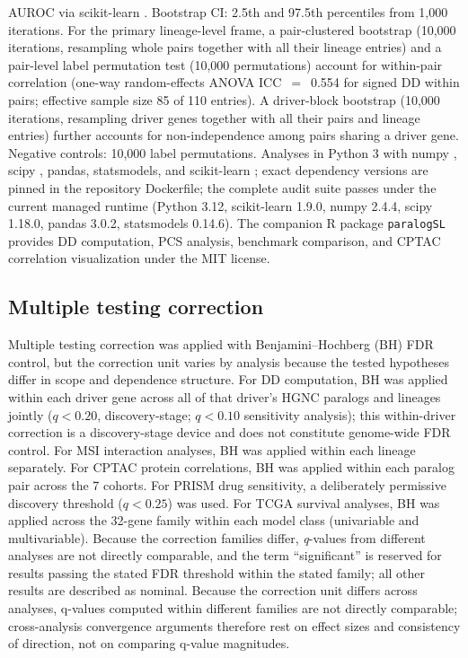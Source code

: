 \documentclass[11pt,a4paper]{article}
\begin{document}
AUROC via scikit-learn \cite{Pedregosa2011}. Bootstrap CI: 2.5th and 97.5th percentiles from 1,000 iterations. For the primary lineage-level frame, a pair-clustered bootstrap (10{,}000 iterations, resampling whole pairs together with all their lineage entries) and a pair-level label permutation test (10{,}000 permutations) account for within-pair correlation (one-way random-effects ANOVA ICC~$=$~0.554 for signed DD within pairs; effective sample size 85 of 110 entries). A driver-block bootstrap (10{,}000 iterations, resampling driver genes together with all their pairs and lineage entries) further accounts for non-independence among pairs sharing a driver gene. Negative controls: 10,000 label permutations. Analyses in Python 3 with numpy \cite{Harris2020}, scipy \cite{Virtanen2020}, pandas, statsmodels, and scikit-learn \cite{Pedregosa2011}; exact dependency versions are pinned in the repository Dockerfile; the complete audit suite passes under the current managed runtime (Python 3.12, scikit-learn 1.9.0, numpy 2.4.4, scipy 1.18.0, pandas 3.0.2, statsmodels 0.14.6). The companion R package \texttt{paralogSL} provides DD computation, PCS analysis, benchmark comparison, and CPTAC correlation visualization under the MIT license.

\subsection*{Multiple testing correction}

Multiple testing correction was applied with Benjamini--Hochberg (BH) FDR control, but the correction unit varies by analysis because the tested hypotheses differ in scope and dependence structure. For DD computation, BH was applied within each driver gene across all of that driver's HGNC paralogs and lineages jointly ($q<0.20$, discovery-stage; $q<0.10$ sensitivity analysis); this within-driver correction is a discovery-stage device and does not constitute genome-wide FDR control. For MSI interaction analyses, BH was applied within each lineage separately. For CPTAC protein correlations, BH was applied within each paralog pair across the 7 cohorts. For PRISM drug sensitivity, a deliberately permissive discovery threshold ($q<0.25$) was used. For TCGA survival analyses, BH was applied across the 32-gene family within each model class (univariable and multivariable). Because the correction families differ, \textit{q}-values from different analyses are not directly comparable, and the term ``significant'' is reserved for results passing the stated FDR threshold within the stated family; all other results are described as nominal. Because the correction unit differs across analyses, q-values computed within different families are not directly comparable; cross-analysis convergence arguments therefore rest on effect sizes and consistency of direction, not on comparing q-value magnitudes.
\end{document}
